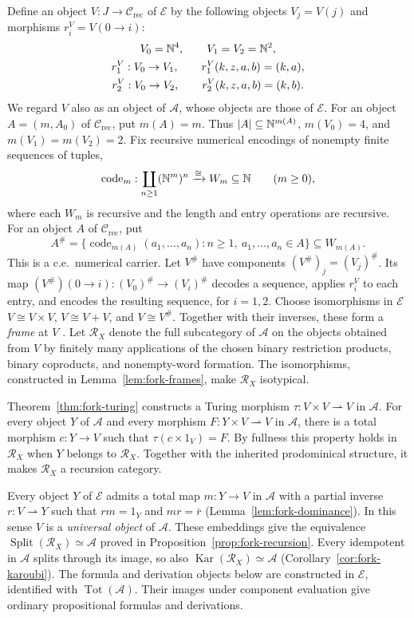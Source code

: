 Define an object $V:J\to\mathcal C_{\mathrm{rec}}$ of $\mathcal E$
by the following objects $V_j=V(j)$ and morphisms
$r_i^V=V(0\to i)$:
\begin{equation}\label{eq:universal-fork}
 \begin{gathered}
 V_0=\mathbb N^4,\qquad V_1=V_2=\mathbb N^2,\\
 r_1^V:V_0\to V_1,\qquad r_1^V(k,z,a,b)=(k,a),\\
 r_2^V:V_0\to V_2,\qquad r_2^V(k,z,a,b)=(k,b).
 \end{gathered}
\end{equation}
We regard $V$ also as an object of $\mathcal A$, whose objects
are those of $\mathcal E$.
For an object $A=(m,A_0)$ of $\mathcal C_{\mathrm{rec}}$, put
$m(A)=m$. Thus $|A|\subseteq\mathbb N^{m(A)}$,
$m(V_0)=4$, and $m(V_1)=m(V_2)=2$.
Fix recursive numerical encodings of nonempty finite sequences of tuples,
\[
 \operatorname{code}_m:
 \coprod_{n\ge1}(\mathbb N^m)^n\xrightarrow{\cong}W_m\subseteq\mathbb N
 \qquad(m\ge0),
\]
where each $W_m$ is recursive and the length and entry operations
are recursive. For an object $A$ of $\mathcal C_{\mathrm{rec}}$, put
\[
 A^\#=\{\operatorname{code}_{m(A)}(a_1,\ldots,a_n):
                 n\ge1,\ a_1,\ldots,a_n\in A\}\subseteq W_{m(A)}.
\]
This is a c.e.\ numerical carrier. Let $V^\#$ have components
$(V^\#)_j=(V_j)^\#$.
Its map $(V^\#)(0\to i):(V_0)^\#\to(V_i)^\#$ decodes a sequence,
applies $r_i^V$ to each entry, and encodes the resulting sequence,
for $i=1,2$.
Choose isomorphisms in $\mathcal E$
$V\cong V\times V$, $V\cong V+V$, and $V\cong V^\#$.
Together with their inverses, these form a \emph{frame} at $V$
\cite[Section 3]{Heller}.
Let $\mathscr R_X$ denote the full subcategory of $\mathcal A$
on the objects obtained from $V$ by finitely many applications of
the chosen binary restriction products, binary coproducts, and
nonempty-word formation.
The isomorphisms, constructed in Lemma~\ref{lem:fork-frames}, make
$\mathscr R_X$ isotypical.

Theorem~\ref{thm:fork-turing} constructs a Turing morphism
$\tau:V\times V\rightharpoonup V$ in $\mathcal A$.
For every object $Y$ of $\mathcal A$ and every morphism
$F:Y\times V\rightharpoonup V$ in $\mathcal A$, there is a
total morphism $c:Y\to V$ such that $\tau(c\times1_V)=F$.
By fullness this property holds in $\mathscr R_X$ when
$Y$ belongs to $\mathscr R_X$. Together with the inherited
prodominical structure, it makes $\mathscr R_X$ a recursion category.

Every object $Y$ of $\mathcal E$ admits a total map $m:Y\to V$ in
$\mathcal A$ with a partial inverse $r:V\rightharpoonup Y$
such that $rm=1_Y$ and $mr=\bar r$
(Lemma~\ref{lem:fork-dominance}). In this sense $V$ is a
\emph{universal object} of $\mathcal A$.
These embeddings give the equivalence
$\operatorname{Split}(\mathscr R_X)\simeq\mathcal A$
proved in Proposition~\ref{prop:fork-recursion}.
Every idempotent in $\mathcal A$ splits through its image, so also
$\operatorname{Kar}(\mathscr R_X)\simeq\mathcal A$
(Corollary~\ref{cor:fork-karoubi}).
The formula and derivation objects below are constructed in
$\mathcal E$, identified with $\operatorname{Tot}(\mathcal A)$. Their images under
component evaluation give ordinary propositional formulas and derivations.

